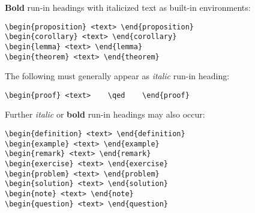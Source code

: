 \begin{alpherate}
\item
{\bf Bold} run-in headings with italicized text
as built-in environments:
\begin{verbatim}
\begin{proposition} <text> \end{proposition}
\begin{corollary} <text> \end{corollary}
\begin{lemma} <text> \end{lemma}
\begin{theorem} <text> \end{theorem}
\end{verbatim}
\item
The following must generally appear as {\it italic} run-in heading:
\begin{verbatim}
\begin{proof} <text>    \qed    \end{proof}
\end{verbatim}
\item
Further {\it italic} or {\bf bold} run-in headings may also occur:
\begin{verbatim}
\begin{definition} <text> \end{definition}
\begin{example} <text> \end{example}
\begin{remark} <text> \end{remark}
\begin{exercise} <text> \end{exercise}
\begin{problem} <text> \end{problem}
\begin{solution} <text> \end{solution}
\begin{note} <text> \end{note}
\begin{question} <text> \end{question}
\end{verbatim}
\end{alpherate}
%
